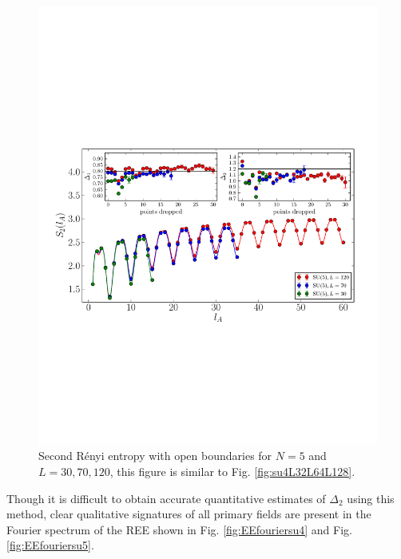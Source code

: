 \documentclass[aps,prb,reprint,floatfix]{revtex4-1}
\begin{document}
\begin{figure}
\centerline{\includegraphics[angle=0,width=1.0\columnwidth]{su5Kll1Kll2.pdf}}
\caption{Second R\'{e}nyi entropy with open boundaries for $N=5$ and $L=30,70,120$, this figure is similar to Fig. \ref{fig:su4L32L64L128}.}
\label{fig:su5L30L70L120}
\end{figure}

Though it is difficult to obtain accurate quantitative estimates of $\Delta_{2}$ using this method, clear qualitative signatures of all primary fields are present in the Fourier spectrum of the REE shown in Fig. \ref{fig:EEfouriersu4} and Fig. \ref{fig:EEfouriersu5}. 
\end{document}
